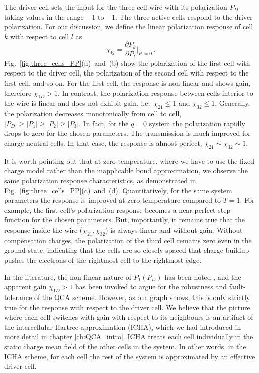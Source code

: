 The driver cell sets the input for the three-cell wire with its
polarization $P_D$ taking values in the range $-1$ to $+1$. The three active
cells respond to the driver polarization. For our discussion, we define the
linear polarization response of cell $k$ with respect to cell $l$ as
%
\begin{equation}
  \label{eq:polarization_response}
  \chi_{kl} = \frac{\partial P_k}{\partial P_l}\big|_{P_l = 0} \, .
\end{equation}
%
Fig.~\ref{fig:three_cells_PP}(a)~and~(b) show the polarization of the first cell
with respect to the driver cell, the polarization of the second cell with
respect to the first cell, and so on. For the first cell, the response is
non-linear and shows gain, therefore $\chi_{1D} > 1$. In contrast, the
polarization response between cells interior to the wire is linear and does not
exhibit gain, i.e.\ $\chi_{21} \le 1$ and $\chi_{32} \le 1$. Generally, the
polarization decreases monotonically from cell to cell, $|P_D| \ge |P_1| \ge
|P_2| \ge |P_3|$. In fact, for the $q=0$ system the polarization rapidly drops
to zero for the chosen parameters. The transmission is much improved for charge
neutral cells. In that case, the response is almost perfect, $\chi_{21} \sim
\chi_{32} \sim 1$.

It is worth pointing out that at zero temperature, where we have to use the
fixed charge model rather than the inapplicable bond approximation, we observe
the same polarization response characteristics, as demonstrated in
Fig.~\ref{fig:three_cells_PP}(c)~and~(d). Quantitatively, for the same system
parameters the response is improved at zero temperature compared to $T=1$. For
example, the first cell's polarization response becomes a near-perfect step
function for the chosen parameters. But, importantly, it remains true that the
response inside the wire ($\chi_{21}, \chi_{32}$) is always linear and without
gain. Without compensation charges, the polarization of the third cell remains
zero even in the ground state, indicating that the cells are so closely spaced
that charge buildup pushes the electrons of the rightmost cell to the rightmost
edge.

In the literature, the non-linear nature of $P_1(P_D)$ has been noted
\cite{lent1993quantum} \cite{lent1993lines}, and the apparent gain $\chi_{1D} >
1$ has been invoked to argue for the robustness and fault-tolerance of the QCA
scheme. However, as our graph shows, this is only strictly true for the response
with respect to the driver cell. We believe that the picture where each cell
switches with gain with respect to its neighbours is an artifact of the
intercellular Hartree approximation (ICHA), which we had introduced in more
detail in chapter \ref{ch:QCA_intro}. ICHA treats each cell individually in the
static charge mean field of the other cells in the system. In other words, in
the ICHA scheme, for each cell the rest of the system is approximated by an
effective driver cell.


